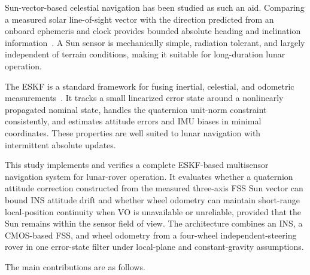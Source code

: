 \documentclass[]{IAC_style}
\begin{document}
Sun-vector-based celestial navigation has been studied as such an aid. Comparing a measured solar line-of-sight vector with the direction predicted from an onboard ephemeris and clock provides bounded absolute heading and inclination information~\cite{ilyas2016integrated,rhee2007satellite}. A Sun sensor is mechanically simple, radiation tolerant, and largely independent of terrain conditions, making it suitable for long-duration lunar operation.

The ESKF is a standard framework for fusing inertial, celestial, and odometric measurements~\cite{lefferts1982kalman,sola2017quaternion,sveinsson2012insgps,groves2013principles}. It tracks a small linearized error state around a nonlinearly propagated nominal state, handles the quaternion unit-norm constraint consistently, and estimates attitude errors and IMU biases in minimal coordinates. These properties are well suited to lunar navigation with intermittent absolute updates.

This study implements and verifies a complete ESKF-based multisensor navigation system for lunar-rover operation. It evaluates whether a quaternion attitude correction constructed from the measured three-axis FSS Sun vector can bound INS attitude drift and whether wheel odometry can maintain short-range local-position continuity when VO is unavailable or unreliable, provided that the Sun remains within the sensor field of view. The architecture combines an INS, a CMOS-based FSS, and wheel odometry from a four-wheel independent-steering rover in one error-state filter under local-plane and constant-gravity assumptions.

The main contributions are as follows.
\end{document}
